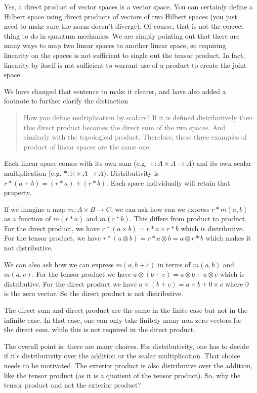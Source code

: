 \documentclass[11pt]{article}
\begin{document}
Yes, a direct product of vector spaces is a vector space. You can
certainly define a Hilbert space using direct products of vectors of
two Hilbert spaces (you just need to make sure the norm doesn't
diverge). Of course, that is not the correct thing to do in quantum
mechanics. We are simply pointing out that there are many ways to map
two linear spaces to another linear space, so requiring linearity on
the spaces is not sufficient to single out the tensor product. In
fact, linearity by itself is not sufficient to warrant use of a
product to create the joint space.

We have changed that sentence to make it clearer, and have also added
a footnote to further clarify the distinction 

\begin{quote}
How you define multiplication by scalars? If it is defined
distributively then this direct product becomes the direct sum of the
two spaces. And similarly with the topological product. Therefore,
these three examples of product of linear spaces are the same one.
\end{quote}

Each linear space comes with its own sum (e.g. $+ : A \times A \to A$)
and its own scalar multiplication (e.g. $* : \mathbb{R} \times A \to
A$). Distributivity is $r * (a + b) = (r*a) + (r*b)$. Each space
individually will retain that property.

If we imagine a map $m : A \times B \to C$, we can ask how can we
express $r*m(a,b)$ as a function of $m(r*a)$ and $m(r*b)$. This
differs from product to product. For the direct product, we have $r *
(a \times b) = r*a \times r*b$ which is distributive. For the tensor
product, we have $r * (a \otimes b) = r*a \otimes b = a \otimes r*b$
which makes it not distributive.

We can also ask how we can express $m(a,b+c)$ in terms of $m(a,b)$ and
$m(a,c)$. For the tensor product we have $a \otimes (b+c) = a \otimes
b + a \otimes c$ which is distributive. For the direct product we have
$a \times (b+c) = a \times b + 0 \times c$ where $0$ is the zero
vector. So the direct product is not distributive.

The direct sum and direct product are the same in the finite case but
not in the infinite case. In that case, one can only take finitely
many non-zero vectors for the direct sum, while this is not required
in the direct product.

The overall point is: there are many choices. For distributivity, one
has to decide if it's distributivity over the addition or the scalar
multiplication. That choice needs to be motivated. The exterior
product is also distributive over the addition, like the tensor
product (as it is a quotient of the tensor product). So, why the
tensor product and not the exterior product?
\end{document}
